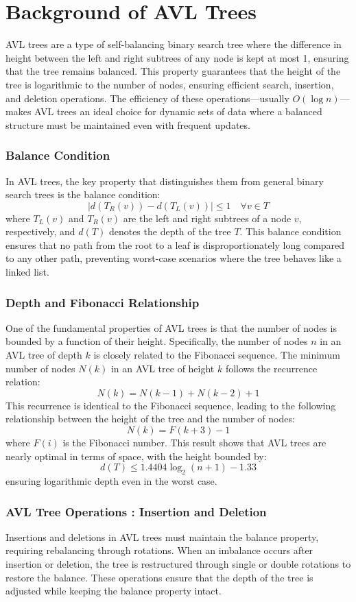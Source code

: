\chapter{Background of AVL Trees}\label{chap:background}

AVL trees are a type of self-balancing binary search tree where the difference in height between the left and right subtrees of any node is kept at most 1, ensuring that the tree remains balanced. This property guarantees that the height of the tree is logarithmic to the number of nodes, ensuring efficient search, insertion, and deletion operations. The efficiency of these operations—usually $O(\log n)$—makes AVL trees an ideal choice for dynamic sets of data where a balanced structure must be maintained even with frequent updates.

\subsection{Balance Condition}
In AVL trees, the key property that distinguishes them from general binary search trees is the balance condition:
\[
|d(T_R(v)) - d(T_L(v))| \leq 1 \quad \forall v \in T
\]
where $T_L(v)$ and $T_R(v)$ are the left and right subtrees of a node $v$, respectively, and $d(T)$ denotes the depth of the tree $T$. This balance condition ensures that no path from the root to a leaf is disproportionately long compared to any other path, preventing worst-case scenarios where the tree behaves like a linked list.

\subsection{Depth and Fibonacci Relationship}
One of the fundamental properties of AVL trees is that the number of nodes is bounded by a function of their height. Specifically, the number of nodes $n$ in an AVL tree of depth $k$ is closely related to the Fibonacci sequence. The minimum number of nodes $N(k)$ in an AVL tree of height $k$ follows the recurrence relation:
\[
N(k) = N(k-1) + N(k-2) + 1
\]
This recurrence is identical to the Fibonacci sequence, leading to the following relationship between the height of the tree and the number of nodes:
\[
N(k) = F(k+3) - 1
\]
where $F(i)$ is the Fibonacci number. This result shows that AVL trees are nearly optimal in terms of space, with the height bounded by:
\[
d(T) \leq 1.4404 \log_2(n + 1) - 1.33
\]
ensuring logarithmic depth even in the worst case.


\subsection{AVL Tree Operations : Insertion and Deletion}
Insertions and deletions in AVL trees must maintain the balance property, requiring rebalancing through rotations. When an imbalance occurs after insertion or deletion, the tree is restructured through single or double rotations to restore the balance. These operations ensure that the depth of the tree is adjusted while keeping the balance property intact.

